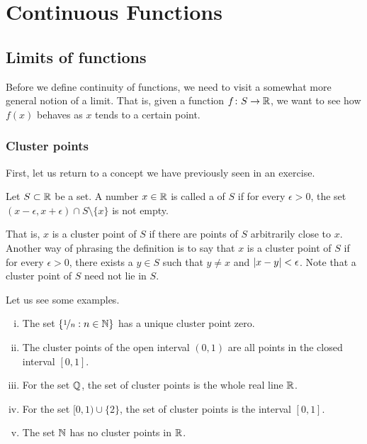 \chapter{Continuous Functions} \label{lim:chapter}


\section{Limits of functions}
\label{sec:limoffunc}


Before we define continuity of functions, we need to visit a somewhat
more general notion of a limit.  That is, given a function $f \colon S \to
{\mathbb{R}}$, we want to see how $f(x)$ behaves as $x$ tends to a certain point.

\subsection{Cluster points}

First,
let us return to a concept we have previously seen in an exercise.

\begin{defn}
Let $S \subset {\mathbb{R}}$ be a set.  A number $x \in {\mathbb{R}}$ is called
a \emph{} of $S$
if for every $\epsilon > 0$, the set $(x-\epsilon,x+\epsilon) \cap S
\setminus \{ x \}$ is not empty.
\end{defn}

That is, $x$ is a cluster point of $S$ if there are points of $S$
arbitrarily close to $x$.  Another way of phrasing the definition is to say
that $x$ is a cluster point of $S$ if for every $\epsilon > 0$, there
exists a $y \in S$ such that $y \not= x$ and $\left\lvert {x - y} \right\rvert < \epsilon$.
Note that a cluster point of $S$ need not lie in $S$.

Let us see some examples.
\begin{enumerate}[(i)]
\item The set
$\{ \nicefrac{1}{n} : n \in {\mathbb{N}} \}$ has a unique cluster point zero.
\item The cluster points of the open interval $(0,1)$ are
all points in the closed interval $[0,1]$.
\item For the set ${\mathbb{Q}}$, the set of
cluster points is the whole real line ${\mathbb{R}}$.
\item For the set $[0,1) \cup \{ 2 \}$,
the set of cluster points is the interval $[0,1]$.
\item The set ${\mathbb{N}}$ has no cluster points in ${\mathbb{R}}$.
\end{enumerate}


